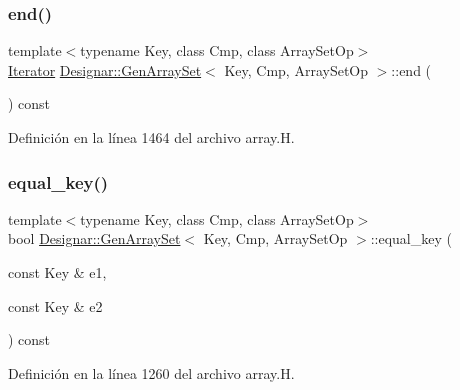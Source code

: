 \subsubsection{\texorpdfstring{end()}{end()}\hspace{0.1cm}{\footnotesize\ttfamily [2/2]}}
{\footnotesize\ttfamily template$<$typename Key, class Cmp, class Array\+Set\+Op$>$ \\
\hyperlink{class_designar_1_1_gen_array_set_1_1_iterator}{Iterator} \hyperlink{class_designar_1_1_gen_array_set}{Designar\+::\+Gen\+Array\+Set}$<$ Key, Cmp, Array\+Set\+Op $>$\+::end (\begin{DoxyParamCaption}{ }\end{DoxyParamCaption}) const\hspace{0.3cm}{\ttfamily [inline]}}



Definición en la línea 1464 del archivo array.\+H.

\mbox{\label{class_designar_1_1_gen_array_set_a2874b036273f5cc48275bd1242453930}} 
\subsubsection{\texorpdfstring{equal\+\_\+key()}{equal\_key()}}
{\footnotesize\ttfamily template$<$typename Key, class Cmp, class Array\+Set\+Op$>$ \\
bool \hyperlink{class_designar_1_1_gen_array_set}{Designar\+::\+Gen\+Array\+Set}$<$ Key, Cmp, Array\+Set\+Op $>$\+::equal\+\_\+key (\begin{DoxyParamCaption}\item[{const Key \&}]{e1,  }\item[{const Key \&}]{e2 }\end{DoxyParamCaption}) const\hspace{0.3cm}{\ttfamily [inline]}}



Definición en la línea 1260 del archivo array.\+H.

\mbox{\label{class_designar_1_1_gen_array_set_a91015348562e7127f2612ad5c13fa016}} 
